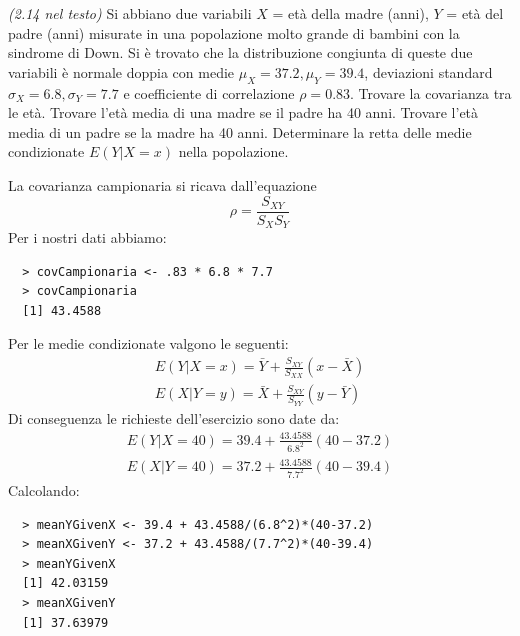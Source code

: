 \begin{exercise}{\emph{(2.14 nel testo)}}
  Si abbiano due variabili $X$ = et\`a della madre (anni), $Y$ = et\`a
  del padre (anni) misurate in una popolazione molto grande di bambini
  con la sindrome di Down. Si \`e trovato che la distribuzione
  congiunta di queste due variabili \`e normale doppia con medie
  $\mu_X = 37.2, \mu_Y = 39.4$, deviazioni standard $\sigma_X = 6.8,
  \sigma_Y = 7.7$ e coefficiente di correlazione $\rho = 0.83$.
  Trovare la covarianza tra le et\`a. Trovare l'et\`a media di una
  madre se il padre ha 40 anni. Trovare l'et\`a media di un padre se
  la madre ha 40 anni. Determinare la retta delle medie condizionate
  $E(Y |X = x)$ nella popolazione.
\end{exercise}
La covarianza campionaria si ricava dall'equazione
\begin{displaymath}
  \rho = \frac{S_{XY}}{S_X S_Y}
\end{displaymath}
Per i nostri dati abbiamo:
\begin{lstlisting}
  > covCampionaria <- .83 * 6.8 * 7.7
  > covCampionaria
  [1] 43.4588
\end{lstlisting}
Per le medie condizionate valgono le seguenti:
\begin{displaymath}
  \begin{split}
    E(Y|X=x)=\bar{Y} + \frac{S_{XY}}{S_{XX}}(x - \bar{X})\\
    E(X|Y=y)=\bar{X} + \frac{S_{XY}}{S_{YY}}(y - \bar{Y})
  \end{split}
\end{displaymath}
Di conseguenza le richieste dell'esercizio sono date da:
\begin{displaymath}
  \begin{split}
    E(Y|X=40)=39.4 + \frac{43.4588}{6.8^2}(40 - 37.2)\\
    E(X|Y=40)=37.2 + \frac{43.4588}{7.7^2}(40 - 39.4)
  \end{split}
\end{displaymath}
Calcolando:
\begin{lstlisting}
  > meanYGivenX <- 39.4 + 43.4588/(6.8^2)*(40-37.2)
  > meanXGivenY <- 37.2 + 43.4588/(7.7^2)*(40-39.4)
  > meanYGivenX
  [1] 42.03159
  > meanXGivenY
  [1] 37.63979
\end{lstlisting}


